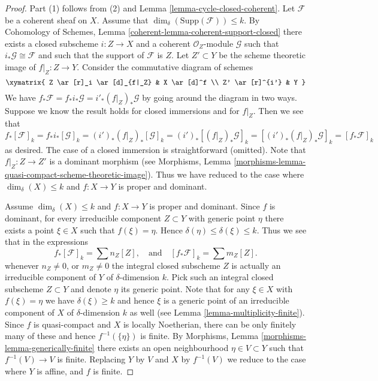 \begin{proof}
Part (1) follows from (2) and Lemma \ref{lemma-cycle-closed-coherent}.
Let $\mathcal{F}$ be a coherent sheaf on $X$.
Assume that $\dim_\delta(\text{Supp}(\mathcal{F})) \leq k$.
By Cohomology of Schemes, Lemma \ref{coherent-lemma-coherent-support-closed}
there exists a closed subscheme $i : Z \to X$ and a coherent
$\mathcal{O}_Z$-module $\mathcal{G}$ such that
$i_*\mathcal{G} \cong \mathcal{F}$ and such that the support
of $\mathcal{F}$ is $Z$. Let $Z' \subset Y$ be the scheme theoretic image
of $f|_Z : Z \to Y$. Consider the commutative diagram of schemes
$$
\xymatrix{
Z \ar[r]_i \ar[d]_{f|_Z} &
X \ar[d]^f \\
Z' \ar[r]^{i'} & Y
}
$$
We have $f_*\mathcal{F} = f_*i_*\mathcal{G} = i'_*(f|_Z)_*\mathcal{G}$
by going around the diagram in two ways. Suppose we know the result holds
for closed immersions and for $f|_Z$. Then we see that
$$
f_*[\mathcal{F}]_k = f_*i_*[\mathcal{G}]_k
= (i')_*(f|_Z)_*[\mathcal{G}]_k =
(i')_*[(f|_Z)_*\mathcal{G}]_k =
[(i')_*(f|_Z)_*\mathcal{G}]_k = [f_*\mathcal{F}]_k
$$
as desired. The case of a closed immersion is straightforward (omitted).
Note that $f|_Z : Z \to Z'$ is a dominant morphism (see
Morphisms, Lemma \ref{morphisms-lemma-quasi-compact-scheme-theoretic-image}).
Thus we have reduced to the case where
$\dim_\delta(X) \leq k$ and $f : X \to Y$ is proper and dominant.

\medskip\noindent
Assume $\dim_\delta(X) \leq k$ and $f : X \to Y$ is proper and dominant.
Since $f$ is dominant, for every irreducible component $Z \subset Y$
with generic point $\eta$ there exists a point $\xi \in X$ such
that $f(\xi) = \eta$. Hence $\delta(\eta) \leq \delta(\xi) \leq k$.
Thus we see that in the expressions
$$
f_*[\mathcal{F}]_k = \sum n_Z[Z],
\quad
\text{and}
\quad
[f_*\mathcal{F}]_k = \sum m_Z[Z].
$$
whenever $n_Z \not = 0$, or $m_Z \not = 0$ the integral closed
subscheme $Z$ is actually an irreducible component of $Y$ of
$\delta$-dimension $k$. Pick such an integral closed subscheme
$Z \subset Y$ and denote $\eta$ its generic point. Note that for
any $\xi \in X$ with $f(\xi) = \eta$ we have $\delta(\xi) \geq k$
and hence $\xi$ is a generic point of an irreducible component
of $X$ of $\delta$-dimension $k$ as well
(see Lemma \ref{lemma-multiplicity-finite}). Since $f$ is quasi-compact
and $X$ is locally Noetherian, there can be only finitely many of
these and hence $f^{-1}(\{\eta\})$ is finite.
By Morphisms, Lemma \ref{morphisms-lemma-generically-finite} there exists
an open neighbourhood $\eta \in V \subset Y$ such that $f^{-1}(V) \to V$
is finite. Replacing $Y$ by $V$ and $X$ by $f^{-1}(V)$ we reduce to the
case where $Y$ is affine, and $f$ is finite.


\end{proof}
